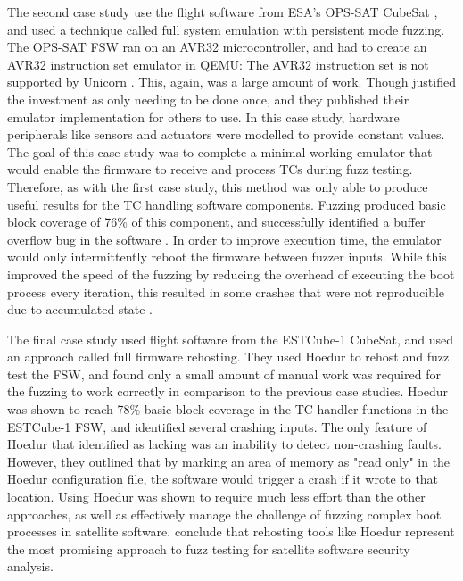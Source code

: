 \documentclass[../report.tex]{subfiles}
\begin{document}
The second case study use the flight software from ESA's OPS-SAT CubeSat \citep{opsat}, and
used a technique \citet{Willbold_2024} called full system emulation with
persistent mode fuzzing. The OPS-SAT FSW ran on an AVR32 microcontroller, and
\citet{Willbold_2024} had to create an AVR32 instruction set emulator in QEMU:
The AVR32 instruction set is not supported by Unicorn \citep{Unicorn}. This,
again, was a large amount of work. Though \citet{Willbold_2024} justified the
investment as only needing to be done once, and they published their
emulator implementation for others to use. In this case study, hardware
peripherals like sensors and actuators were modelled to provide constant
values. The goal of this case study was to complete a minimal working emulator
that would enable the firmware to receive and process TCs during fuzz testing.
Therefore, as with the first case study, this method was only able to produce
useful results for the TC handling software components. Fuzzing produced
basic block coverage of 76\% of this component, and successfully identified a
buffer overflow bug in the software \citep{Willbold_2024}. In order to improve
execution time, the emulator would only intermittently reboot the firmware
between fuzzer inputs. While this improved the speed of the fuzzing by reducing
the overhead of executing the boot process every iteration, this resulted in
some crashes that were not reproducible due to accumulated state
\citep{Willbold_2024}.

The final case study used flight software from the ESTCube-1 CubeSat, and used
an approach \citet{Willbold_2024} called full firmware rehosting. They used
Hoedur \citep{Hoedur_2023} to rehost and fuzz test the FSW, and found only
a small amount of manual work was required for the fuzzing to work correctly in
comparison to the previous case studies. Hoedur was shown to reach 78\% basic
block coverage in the TC handler functions in the ESTCube-1 FSW, and identified
several crashing inputs. The only feature of Hoedur that \citet{Willbold_2024}
identified as lacking was an inability to detect non-crashing faults. However,
they outlined that by marking an area of memory as "read only" in the Hoedur
configuration file, the software would trigger a crash if it wrote to that
location. Using Hoedur was shown to require much less effort than the other
approaches, as well as effectively manage the challenge of fuzzing complex boot
processes in satellite software. \citet{Willbold_2024} conclude that rehosting
tools like Hoedur represent the most promising approach to fuzz testing for
satellite software security analysis.





%
\end{document}
